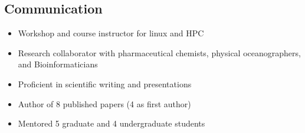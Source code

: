 \begin{multicols}{2}

\subsection{Communication}
\begin{itemize}
\item{Workshop and course instructor for linux and HPC}
\item{Research collaborator with pharmaceutical chemists, physical oceanographers, and Bioinformaticians}
\item{Proficient in scientific writing and presentations}
\item{Author of 8 published papers (4 as first author)}
\item{Mentored 5 graduate and 4 undergraduate students}
\end{itemize}

\end{multicols}




